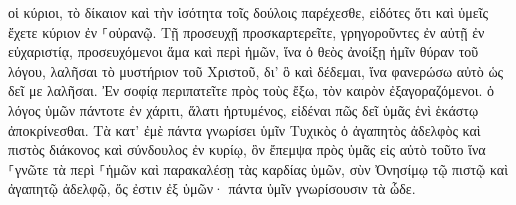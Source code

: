 \documentclass{openreader}
\begin{document}
οἱ κύριοι, τὸ δίκαιον καὶ τὴν ἰσότητα τοῖς δούλοις παρέχεσθε, εἰδότες ὅτι καὶ ὑμεῖς ἔχετε κύριον ἐν ⸀οὐρανῷ. 
Τῇ προσευχῇ προσκαρτερεῖτε, γρηγοροῦντες ἐν αὐτῇ ἐν εὐχαριστίᾳ, 
προσευχόμενοι ἅμα καὶ περὶ ἡμῶν, ἵνα ὁ θεὸς ἀνοίξῃ ἡμῖν θύραν τοῦ λόγου, λαλῆσαι τὸ μυστήριον τοῦ Χριστοῦ, δι’ ὃ καὶ δέδεμαι, 
ἵνα φανερώσω αὐτὸ ὡς δεῖ με λαλῆσαι. 
Ἐν σοφίᾳ περιπατεῖτε πρὸς τοὺς ἔξω, τὸν καιρὸν ἐξαγοραζόμενοι. 
ὁ λόγος ὑμῶν πάντοτε ἐν χάριτι, ἅλατι ἠρτυμένος, εἰδέναι πῶς δεῖ ὑμᾶς ἑνὶ ἑκάστῳ ἀποκρίνεσθαι. 
Τὰ κατ’ ἐμὲ πάντα γνωρίσει ὑμῖν Τυχικὸς ὁ ἀγαπητὸς ἀδελφὸς καὶ πιστὸς διάκονος καὶ σύνδουλος ἐν κυρίῳ, 
ὃν ἔπεμψα πρὸς ὑμᾶς εἰς αὐτὸ τοῦτο ἵνα ⸀γνῶτε τὰ περὶ ⸀ἡμῶν καὶ παρακαλέσῃ τὰς καρδίας ὑμῶν, 
σὺν Ὀνησίμῳ τῷ πιστῷ καὶ ἀγαπητῷ ἀδελφῷ, ὅς ἐστιν ἐξ ὑμῶν· πάντα ὑμῖν γνωρίσουσιν τὰ ὧδε. 
\end{document}
